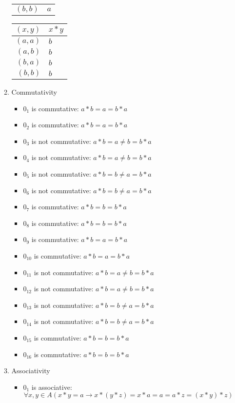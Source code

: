 \begin{enumerate}[label={\Alph*.},font={\bfseries}]
\begin{enumerate}[label={\arabic*},font={\bfseries}]
\begin{minipage}[h]{.25\textwidth}
\begin{tabular}{ r | l }
        $(b,b)$ & $a$
      \end{tabular}
    \end{minipage}
    \begin{minipage}[h]{.25\textwidth}
      \begin{tabular}{ r | l }
        $(x,y)$ & $x*y$ \\
        \hline
        $(a,a)$ & $b$ \\
        $(a,b)$ & $b$ \\
        $(b,a)$ & $b$ \\
        $(b,b)$ & $b$
      \end{tabular}
    \end{minipage}
  \item Commutativity
    \begin{itemize}
    \item $0_1$ is commutative: $a*b=a=b*a$
    \item $0_2$ is commutative: $a*b=a=b*a$
    \item $0_3$ is not commutative: $a*b=a \neq b=b*a$
    \item $0_4$ is not commutative: $a*b=a \neq b=b*a$
    \item $0_5$ is not commutative: $a*b=b \neq a=b*a$
    \item $0_6$ is not commutative: $a*b=b \neq a=b*a$
    \item $0_7$ is commutative: $a*b=b=b*a$
    \item $0_8$ is commutative: $a*b=b=b*a$
    \item $0_9$ is commutative: $a*b=a=b*a$
    \item $0_{10}$ is commutative: $a*b=a=b*a$
    \item $0_{11}$ is not commutative: $a*b=a \neq b=b*a$
    \item $0_{12}$ is not commutative: $a*b=a \neq b=b*a$
    \item $0_{13}$ is not commutative: $a*b=b \neq a=b*a$
    \item $0_{14}$ is not commutative: $a*b=b \neq a=b*a$
    \item $0_{15}$ is commutative: $a*b=b=b*a$
    \item $0_{16}$ is commutative: $a*b=b=b*a$
    \end{itemize}
  \item Associativity
    \begin{itemize}
    \item $0_1$ is associative:
      $$\forall x,y \in A (x*y=a \to x*(y*z)=x*a=a=a*z=(x*y)*z)$$

\end{itemize}
\end{enumerate}
\end{enumerate}
